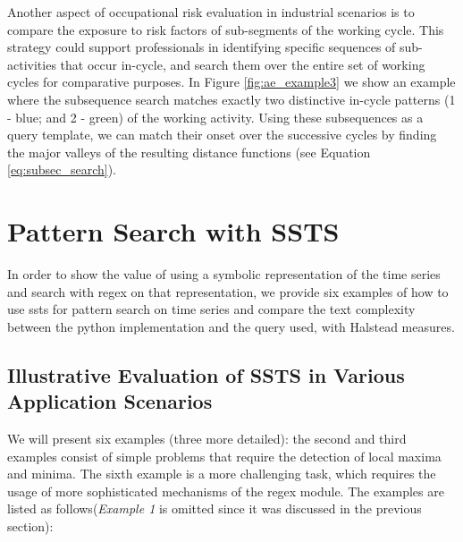Another aspect of occupational risk evaluation in industrial scenarios is to compare the exposure to risk factors of sub-segments of the working cycle. This strategy could support professionals in identifying specific sequences of sub-activities that occur in-cycle, and search them over the entire set of working cycles for comparative purposes. In Figure \ref{fig:ae_example3} we show an example where the subsequence search matches exactly two distinctive in-cycle patterns (1 - blue; and 2 - green) of the working activity. Using these subsequences as a query template, we can match their onset over the successive cycles by finding the major valleys of the resulting distance functions (see Equation \ref{eq:subsec_search}).

\section{Pattern Search with SSTS}

In order to show the value of using a symbolic representation of the time series and search with \gls{regex} on that representation, we provide six examples of how to use \gls{ssts} for pattern search on time series and compare the text complexity between the python implementation and the query used, with Halstead measures. 

\subsection{Illustrative Evaluation of SSTS in Various Application Scenarios}

We will present six examples (three more detailed): the second and third examples consist of simple problems that require the detection of local maxima and minima. The sixth example is a more challenging task, which requires the usage of more sophisticated mechanisms of the \gls{regex} module. The examples are listed as follows(\textit{Example 1} is omitted since it was discussed in the previous section):

